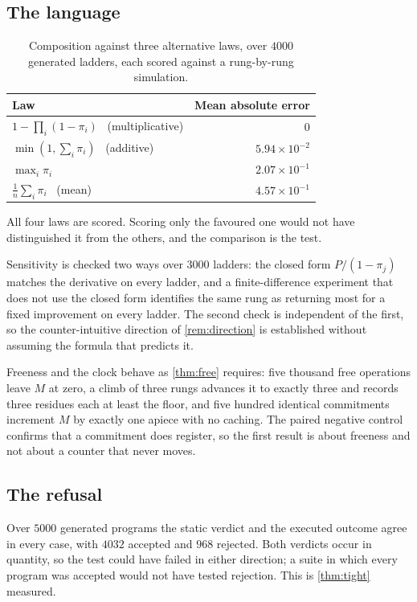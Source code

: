 \documentclass[11pt,twocolumn,a4paper]{article}
\theoremstyle{plain}
\theoremstyle{definition}
\theoremstyle{remark}
\newcommand{\pow}{\pi}
\begin{document}
\subsection{The language}

\begin{table}[!htbp]
\centering
\caption{Composition against three alternative laws, over $4000$ generated
ladders, each scored against a rung-by-rung simulation.}
\label{tab:laws}
\begin{tabular}{lr}
\toprule
Law & Mean absolute error \\
\midrule
$1-\prod_i(1-\pow_i)$ \ (multiplicative) & $0$ \\
$\min(1,\sum_i\pow_i)$ \ (additive)      & $5.94\times10^{-2}$ \\
$\max_i\pow_i$                           & $2.07\times10^{-1}$ \\
$\frac1n\sum_i\pow_i$ \ (mean)           & $4.57\times10^{-1}$ \\
\bottomrule
\end{tabular}
\end{table}

All four laws are scored. Scoring only the favoured one would not have
distinguished it from the others, and the comparison is the test.

Sensitivity is checked two ways over $3000$ ladders: the closed form
$P/(1-\pow_j)$ matches the derivative on every ladder, and a finite-difference
experiment that does not use the closed form identifies the same rung as
returning most for a fixed improvement on every ladder. The second check is
independent of the first, so the counter-intuitive direction of
\cref{rem:direction} is established without assuming the formula that predicts
it.

Freeness and the clock behave as \cref{thm:free} requires: five thousand free
operations leave $M$ at zero, a climb of three rungs advances it to exactly
three and records three residues each at least the floor, and five hundred
identical commitments increment $M$ by exactly one apiece with no caching. The
paired negative control confirms that a commitment does register, so the first
result is about freeness and not about a counter that never moves.

\subsection{The refusal}

Over $5000$ generated programs the static verdict and the executed outcome
agree in every case, with $4032$ accepted and $968$ rejected. Both verdicts
occur in quantity, so the test could have failed in either direction; a suite
in which every program was accepted would not have tested rejection. This is
\cref{thm:tight} measured.
\end{document}
